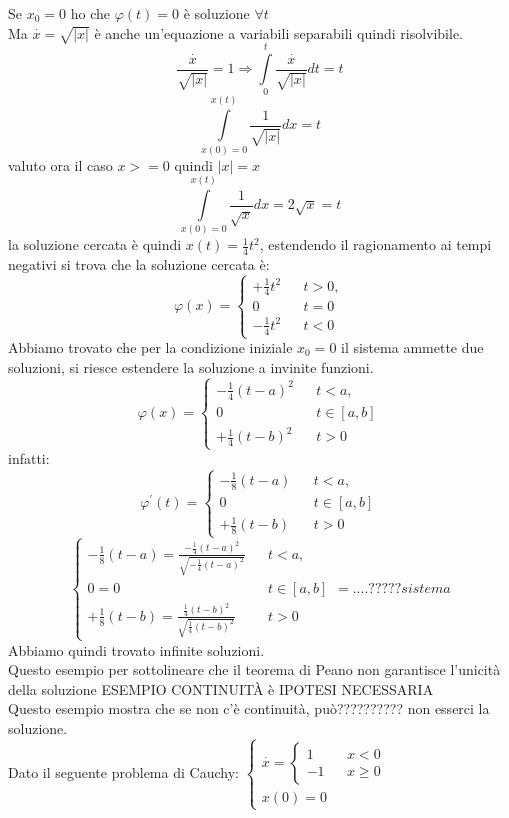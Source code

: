 Se $x_0 = 0$ ho che $\varphi(t)=0$ è soluzione $\forall t$\\
Ma $\overset{\cdot}{x} = \sqrt{|x|}$ è anche un'equazione a variabili separabili quindi risolvibile.\\
$$\frac{\overset{\cdot}{x}}{\sqrt{|x|}}=1 \Rightarrow \int\limits_{0}^{t}{\frac{\overset{\cdot}{x}}{\sqrt{|x|}}dt} = t$$
$$\int\limits_{x(0)=0}^{x(t)}{\frac{1}{\sqrt{|x|}}dx} = t$$
valuto ora il caso $x>=0$ quindi $|x|=x$
$$ \int\limits_{x(0)=0}^{x(t)}{\frac{1}{\sqrt{x}}dx} = 2\sqrt{x} = t$$ 
la soluzione cercata è quindi $x(t)=\frac{1}{4}t^2$, 
estendendo il ragionamento ai tempi negativi si trova che la soluzione cercata è: $$\varphi(x)= \left\{\begin{matrix}+\frac{1}{4}t^2&&t>0,\\0&&t=0\\-\frac{1}{4}t^2&&t<0\end{matrix}\right.$$ 
Abbiamo trovato che per la condizione iniziale $x_0=0$ il sistema ammette due soluzioni, si riesce estendere la soluzione a invinite funzioni.
$$\varphi(x)= \left\{\begin{matrix}-\frac{1}{4}(t-a)^2&&t<a,\\0&&t\in[a,b]\\+\frac{1}{4}(t-b)^2&&t>0\end{matrix}\right.$$
infatti:
$$\varphi^{'}(t) = \left\{\begin{matrix}-\frac{1}{8}(t-a)&&t<a,\\0&&t\in[a,b]\\+\frac{1}{8}(t-b)&&t>0\end{matrix}\right.$$ $$\left\{\begin{matrix}-\frac{1}{8}(t-a)=\frac{-\frac{1}{4}(t-a)^2}{	\sqrt{-\frac{1}{4}(t-a)^2}}&&t<a,\\0=0&&t\in[a,b]\\+\frac{1}{8}(t-b)=\frac{\frac{1}{4}(t-b)^2}{\sqrt{\frac{1}{4}(t-b)^2}}&&t>0\end{matrix}\right. = ....????? sistema $$
Abbiamo quindi trovato infinite soluzioni.\\
Questo esempio per sottolineare che il teorema di Peano non garantisce l'unicità della soluzione
ESEMPIO CONTINUITÀ è IPOTESI NECESSARIA\\
Questo esempio mostra che se non c'è continuità, può?????????? non esserci la soluzione.\\
Dato il seguente problema di Cauchy: $\left\{\begin{matrix}
\overset{\cdot}{x} = \left\{\begin{matrix}1&&x<0\\-1&&x\ge 0\end{matrix}\right.\\
x(0)=0
\end{matrix}\right.$\\

